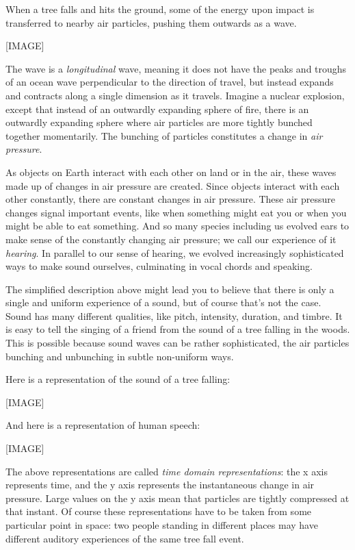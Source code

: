 \documentclass[UTF8]{book}
\begin{document}
\begin{CJK}{UTF8}{gbsn}
When a tree falls and hits the ground, some of the energy upon impact is transferred to nearby air particles, pushing them outwards as a wave.

[IMAGE]

The wave is a \emph{longitudinal} wave, meaning it does not have the peaks and troughs of an ocean wave perpendicular to the direction of travel, but instead expands and contracts along a single dimension as it travels. Imagine a nuclear explosion, except that instead of an outwardly expanding sphere of fire, there is an outwardly expanding sphere where air particles are more tightly bunched together momentarily. The bunching of particles constitutes a change in \emph{air pressure}.

As objects on Earth interact with each other on land or in the air, these waves made up of changes in air pressure are created. Since objects interact with each other constantly, there are constant changes in air pressure. These air pressure changes signal important events, like when something might eat you or when you might be able to eat something. And so many species including us evolved ears to make sense of the constantly changing air pressure; we call our experience of it \emph{hearing}. In parallel to our sense of hearing, we evolved increasingly sophisticated ways to make sound ourselves, culminating in vocal chords and speaking.

The simplified description above might lead you to believe that there is only a single and uniform experience of a sound, but of course that's not the case. Sound has many different qualities, like pitch, intensity, duration, and timbre. It is easy to tell the singing of a friend from the sound of a tree falling in the woods. This is possible because sound waves can be rather sophisticated, the air particles bunching and unbunching in subtle non-uniform ways.

Here is a representation of the sound of a tree falling:

[IMAGE]

And here is a representation of human speech:

[IMAGE]

The above representations are called \emph{time domain representations}: the x axis represents time, and the y axis represents the instantaneous change in air pressure. Large values on the y axis mean that particles are tightly compressed at that instant. Of course these representations have to be taken from some particular point in space: two people standing in different places may have different auditory experiences of the same tree fall event.


\end{CJK}
\end{document}
